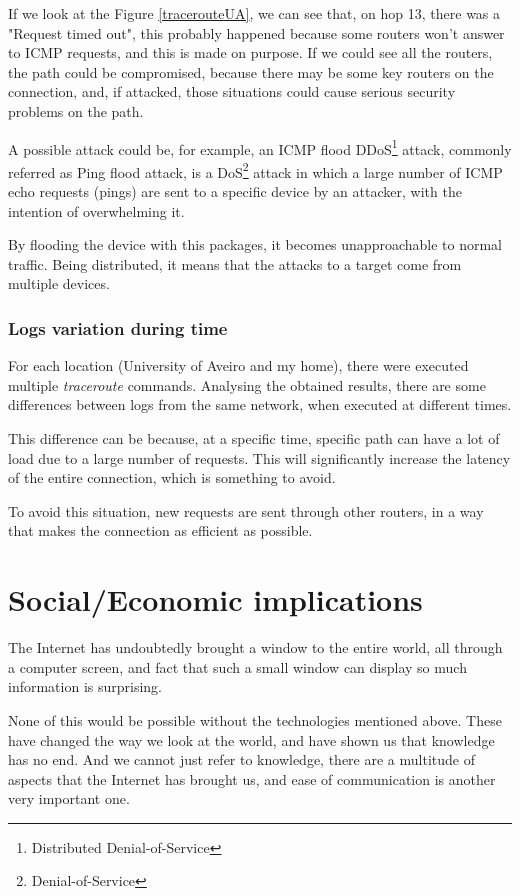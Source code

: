\documentclass{article}
\newcommand\tab[1][1cm]{\hspace*{#1}}
\begin{document}
\tab If we look at the Figure \underline{\ref{tracerouteUA}}, we can see that, on hop 13, there was a "Request timed out", this probably happened because some routers won't answer to ICMP requests, and this is made on purpose. If we could see all the routers, the path could be compromised, because there may be some key routers on the connection, and, if attacked, those situations could cause serious security problems on the path.

A possible attack could be, for example, an ICMP flood DDoS\footnote{Distributed Denial-of-Service} attack, commonly referred as Ping flood attack, is a DoS\footnote{Denial-of-Service} attack in which a large number of ICMP echo requests (pings) are sent to a specific device by an attacker, with the intention of overwhelming it. 

By flooding the device with this packages, it becomes unapproachable to normal traffic. Being distributed, it means that the attacks to a target come from multiple devices.

\subsubsection{Logs variation during time}

\tab For each location (University of Aveiro and my home), there were executed multiple \textit{traceroute} commands. Analysing the obtained results, there are some differences between logs from the same network, when executed at different times. 

This difference can be because, at a specific time, specific path can have a lot of load due to a large number of requests. This will significantly increase the latency of the entire connection, which is something to avoid.

To avoid this situation, new requests are sent through other routers, in a way that makes the connection as efficient as possible.

\newpage

\section{Social/Economic implications}

\tab The Internet has undoubtedly brought a window to the entire world, all through a computer screen, and fact that such a small window can display so much information is surprising.

None of this would be possible without the technologies mentioned above. These have changed the way we look at the world, and have shown us that knowledge has no end. And we cannot just refer to knowledge, there are a multitude of aspects that the Internet has brought us, and ease of communication is another very important one.
\end{document}
